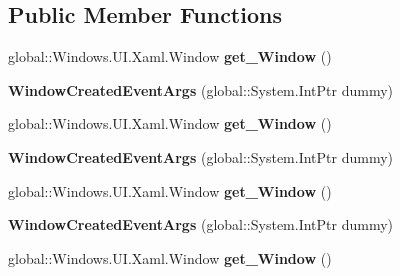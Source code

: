 \subsection*{Public Member Functions}
\begin{DoxyCompactItemize}
\item 
\mbox{\label{class_windows_1_1_u_i_1_1_xaml_1_1_window_created_event_args_ac7ddcc90a585fa511fa5332dc63a1141}} 
global\+::\+Windows.\+U\+I.\+Xaml.\+Window {\bfseries get\+\_\+\+Window} ()
\item 
\mbox{\label{class_windows_1_1_u_i_1_1_xaml_1_1_window_created_event_args_a4d91513082c364adeb85991c266e4728}} 
{\bfseries Window\+Created\+Event\+Args} (global\+::\+System.\+Int\+Ptr dummy)
\item 
\mbox{\label{class_windows_1_1_u_i_1_1_xaml_1_1_window_created_event_args_ac7ddcc90a585fa511fa5332dc63a1141}} 
global\+::\+Windows.\+U\+I.\+Xaml.\+Window {\bfseries get\+\_\+\+Window} ()
\item 
\mbox{\label{class_windows_1_1_u_i_1_1_xaml_1_1_window_created_event_args_a4d91513082c364adeb85991c266e4728}} 
{\bfseries Window\+Created\+Event\+Args} (global\+::\+System.\+Int\+Ptr dummy)
\item 
\mbox{\label{class_windows_1_1_u_i_1_1_xaml_1_1_window_created_event_args_ac7ddcc90a585fa511fa5332dc63a1141}} 
global\+::\+Windows.\+U\+I.\+Xaml.\+Window {\bfseries get\+\_\+\+Window} ()
\item 
\mbox{\label{class_windows_1_1_u_i_1_1_xaml_1_1_window_created_event_args_a4d91513082c364adeb85991c266e4728}} 
{\bfseries Window\+Created\+Event\+Args} (global\+::\+System.\+Int\+Ptr dummy)
\item 
\mbox{\label{class_windows_1_1_u_i_1_1_xaml_1_1_window_created_event_args_ac7ddcc90a585fa511fa5332dc63a1141}} 
global\+::\+Windows.\+U\+I.\+Xaml.\+Window {\bfseries get\+\_\+\+Window} ()

\end{DoxyCompactItemize}
